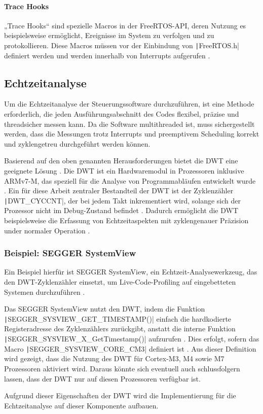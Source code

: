 \paragraph{Trace Hooks}

„Trace Hooks“ sind spezielle Macros in der FreeRTOS-API, deren Nutzung es
beispielsweise ermöglicht, Ereignisse im System zu verfolgen und zu
protokollieren. Diese Macros müssen vor der Einbindung von
\texttt|FreeRTOS.h| definiert werden und werden innerhalb von
Interrupts aufgerufen \cite{freertos_rtos_trace_hooks}.

\subsection{Echtzeitanalyse}

Um die Echtzeitanalyse der Steuerungssoftware durchzuführen, ist eine Methode
erforderlich, die jeden Ausführungsabschnitt des Codes flexibel, präzise und
threadsicher messen kann. Da die Software multithreaded ist, muss sichergestellt
werden, dass die Messungen trotz Interrupts und preemptivem Scheduling korrekt
und zyklengetreu durchgeführt werden können.

Basierend auf den oben genannten Herausforderungen bietet die \ac{DWT} eine
geeignete Lösung \cite{ARM_KA001499}. Die DWT ist ein Hardwaremodul in
Prozessoren inklusive ARMv7-M, das speziell für die Analyse von Programmabläufen
entwickelt wurde \cite{ARMv7_ref_man_dwt_profiling}. Ein für diese Arbeit
zentraler Bestandteil der DWT ist der Zyklenzähler \texttt|DWT_CYCCNT|,
der bei jedem Takt inkrementiert wird, solange sich der Prozessor nicht im
Debug-Zustand befindet \cite{ARMv7_ref_man_dwt_cycle}. Dadurch ermöglicht die
DWT beispielsweise die Erfassung von Echtzeitaspekten mit zyklengenauer
Präzision under normaler Operation \cite{ARMv7_ref_man_dwt}.

\subsubsection{Beispiel: SEGGER SystemView}

Ein Beispiel hierfür ist SEGGER SystemView, ein Echtzeit-Analysewerkzeug, das
den DWT-Zyklenzähler einsetzt, um Live-Code-Profiling auf eingebetteten Systemen
durchzuführen \cite{SEGGER_SystemView}.

Das SEGGER SystemView nutzt den DWT, indem die Funktion \linebreak
\texttt|SEGGER_SYSVIEW_GET_TIMESTAMP()| einfach die hardkodierte
Registeradresse des Zyklenzählers zurückgibt, anstatt die interne Funktion
\texttt|SEGGER_SYSVIEW_X_GetTimestamp()| aufzurufen
\cite{SystemView_Config, Arm_DWT_Programmers_Model}. Dies erfolgt, sofern das
Macro \texttt|SEGGER_SYSVIEW_CORE_CM3| definiert ist
\cite{SystemView_Config_79}. Aus dieser Definition wird gezeigt, dass die
Nutzung des DWT für Cortex-M3, M4 sowie M7 Prozessoren aktiviert wird. Daraus
könnte sich eventuell auch schlussfolgern lassen, dass der DWT nur auf diesen
Prozessoren verfügbar ist.

Aufgrund dieser Eigenschaften der DWT wird die Implementierung für die
Echtzeitanalyse auf dieser Komponente aufbauen.
